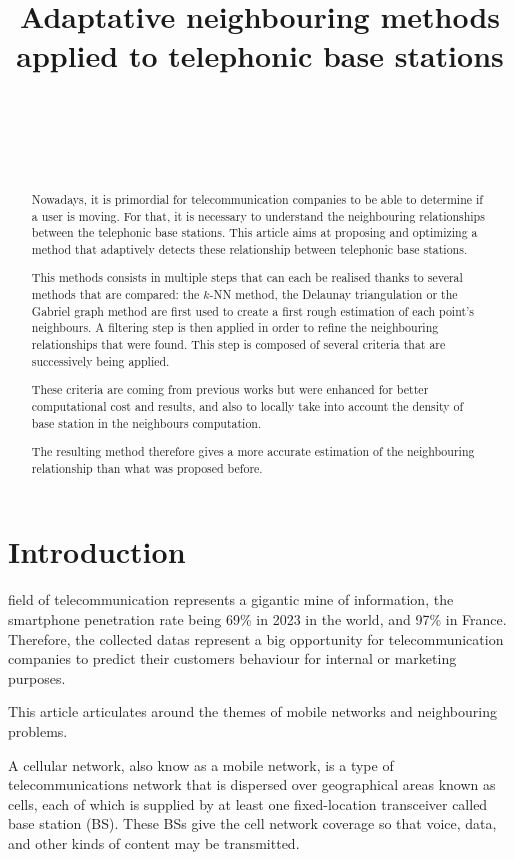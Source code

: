 \documentclass[lettersize,journal,english]{IEEEtran}
\title{Adaptative neighbouring methods applied to telephonic base stations}
\author{\IEEEauthorblockN{Paul MÉHAUD}\\
\IEEEauthorblockA{\textit{Intern at CTU in Prague} \\
\textit{INSA Rouen Normandie}\\
paul.mehaud@insa-rouen.fr}\\
\and
\IEEEauthorblockN{Brendan SÉVELLEC}\\
\IEEEauthorblockA{\textit{Intern at CTU in Prague} \\
\textit{INSA Rouen Normandie}\\
brendan.sevellec@insa-rouen.fr}}
\begin{document}
\maketitle

\begin{abstract}
    Nowadays, it is primordial for telecommunication companies to be able to determine if a user is moving. For that, it is necessary to understand the neighbouring relationships between the telephonic base stations. This article aims at proposing and optimizing a method that adaptively detects these relationship between telephonic base stations. 
    
    This methods consists in multiple steps that can each be realised thanks to several methods that are compared: the $k$-NN method, the Delaunay triangulation or the Gabriel graph method are first used to create a first rough estimation of each point's neighbours. A filtering step is then applied in order to refine the neighbouring relationships that were found. This step is composed of several criteria that are successively being applied. 
    
    These criteria are coming from previous works but were enhanced for better computational cost and results, and also to locally take into account the density of base station in the neighbours computation. 
    
    The resulting method therefore gives a more accurate estimation of the neighbouring relationship than what was proposed before.
\end{abstract}
\section{Introduction}
     field of telecommunication represents a gigantic mine of information, the smartphone penetration rate being 69\% in 2023 in the world, and 97\% in France. Therefore, the collected datas represent a big opportunity for telecommunication companies to predict their customers behaviour for internal or marketing purposes. 
    
    This article articulates around the themes of mobile networks and neighbouring problems. 

    A cellular network, also know as a mobile network, is a type of telecommunications network that is dispersed over geographical areas known as cells, each of which is supplied by at least one fixed-location transceiver called base station (BS). These BSs give the cell network coverage so that voice, data, and other kinds of content may be transmitted.
    
\end{document}

